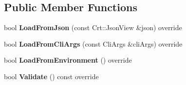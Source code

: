 \subsection*{Public Member Functions}
\begin{DoxyCompactItemize}
\item 
\mbox{\label{struct_aws_1_1_iot_1_1_device_client_1_1_plain_config_a2cccd6d88d19ab4d15014fd718cb90fb}} 
bool {\bfseries Load\+From\+Json} (const Crt\+::\+Json\+View \&json) override
\item 
\mbox{\label{struct_aws_1_1_iot_1_1_device_client_1_1_plain_config_aca2e22c920f0474f7be0fcb6bab1b44f}} 
bool {\bfseries Load\+From\+Cli\+Args} (const Cli\+Args \&cli\+Args) override
\item 
\mbox{\label{struct_aws_1_1_iot_1_1_device_client_1_1_plain_config_abf75909bc58d9b0c6a0ca6fdd4ecbf60}} 
bool {\bfseries Load\+From\+Environment} () override
\item 
\mbox{\label{struct_aws_1_1_iot_1_1_device_client_1_1_plain_config_ae460d8fd7839cfb6992a984b6f96f784}} 
bool {\bfseries Validate} () const override
\end{DoxyCompactItemize}
